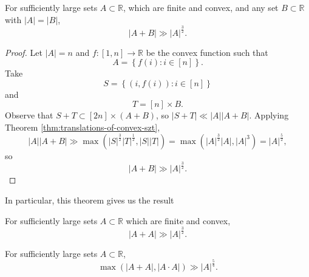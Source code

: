 \documentclass[12pt]{amsart}
\begin{document}
\begin{theorem}
For sufficiently large sets \(A \subset \mathbb{R} \), which are finite and convex, and any set \(B \subset \mathbb{R} \) with \(\left\lvert A \right\rvert = \left\lvert B \right\rvert \),
\[
    \left\lvert A + B \right\rvert \gg \left\lvert A \right\rvert ^{\frac{3}{2} }
.\]
\end{theorem}

\begin{proof}
Let \(\left\lvert A \right\rvert = n\) and \(f : [1,n] \to \mathbb{R} \) be the convex function
such that
\[
    A = \left\{ f(i): i \in [n] \right\}
.\]
Take
\[
    S = \left\{ (i,f(i)) : i \in [n] \right\} 
\]
and
\[
    T = [n] \times B
.\]
Observe that \(S + T \subset [2n] \times (A + B)\), so \(\left\lvert S + T \right\rvert \ll \left\lvert A \right\rvert \left\lvert A + B \right\rvert \). Applying Theorem \ref{thm:translations-of-convex-szt},
\[
    \left\lvert A \right\rvert \left\lvert A + B \right\rvert \gg \max \left( \left\lvert S \right\rvert ^{\frac{3}{2} }\left\lvert T \right\rvert ^{\frac{1}{2} } , \left\lvert S \right\rvert \left\lvert T \right\rvert  \right) = \max \left( \left\lvert A \right\rvert ^{\frac{3}{2} }\left\lvert A \right\rvert , \left\lvert A \right\rvert ^{3} \right) = \left\lvert A \right\rvert ^{\frac{5}{2} }
,\]
so
\[
    \left\lvert A + B \right\rvert \gg \left\lvert A \right\rvert ^{\frac{3}{2} }
.\]
\end{proof}

In particular, this theorem gives us the result
\begin{theorem}
For sufficiently large sets \(A \subset \mathbb{R} \) which are finite and convex,
\[
    \left\lvert A+A \right\rvert \gg \left\lvert A \right\rvert ^{\frac{3}{2} }
.\]
\end{theorem}


\begin{theorem}
    For sufficiently large sets \(A \subset \mathbb{R} \),
    \[
        \max \left( \left\lvert A+A \right\rvert, \left\lvert A\cdot A \right\rvert  \right) \gg \left\lvert A \right\rvert ^{\frac{5}{4} }
    .\]
\end{theorem}
\end{document}
